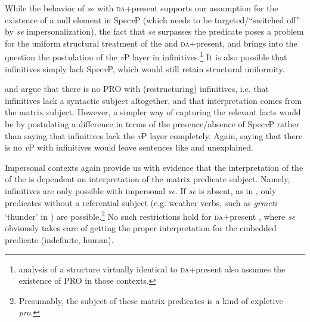 \documentclass[output=paper,modfonts,newtxmath,hidelinks,]{langscibook}
\begin{document}
\ea \label{7:ex14}
	\z
\z

\noindent While the behavior of \textit{se} with \textsc{da}+present supports our assumption for the existence of a null element in Spec\textit{v}P (which needs to be targeted/``switched off'' by \textit{se} impersonalization), the fact that \textit{se} surpasses the  predicate poses a problem for the uniform structural treatment of the  and \textsc{da}+present, and brings into the question the postulation of the \textit{v}P layer in infinitives.\footnote{\label{7:fn5} analysis of a structure virtually identical to \textsc{da}+present also assumes the existence of PRO in those contexts.} It is also possible that infinitives simply lack Spec\textit{v}P, which would still retain structural uniformity.\largerpage[2]

\citet{Wurmbrand2003} and \citet{TodorovicWurmbrand2015} argue that there is no PRO with (restructuring) infinitives, i.e. that infinitives lack a syntactic subject altogether, and that interpretation comes from the matrix subject. However, a simpler way of capturing the relevant facts would be by postulating a difference in terms of the presence/absence of Spec\textit{v}P rather than saying that infinitives lack the \textit{v}P layer completely. Again, saying that there is no \textit{v}P with infinitives would leave sentences like  and  unexplained.

Impersonal contexts again provide us with evidence that the interpretation of the  of the  is dependent on interpretation of the matrix predicate subject. Namely, infinitives are only possible with impersonal \textit{se}. If \textit{se} is absent, as in , only predicates without a referential subject (e.g. weather verbs, such as \textit{grmeti} ‘thunder’ in ) are possible.\footnote{\label{7:fn6}Presumably, the subject of these matrix predicates is a kind of expletive \textit{pro}.} No such restrictions hold for \textsc{da}+present , where \textit{se} obviously takes care of getting the proper interpretation for the embedded predicate (indefinite, human).
\end{document}
